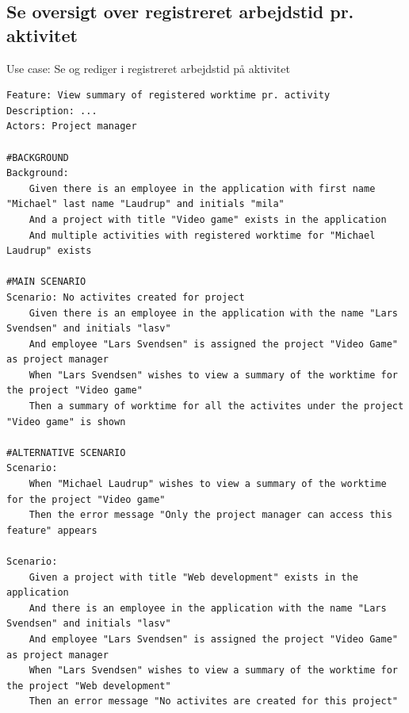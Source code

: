 \subsection{Se oversigt over registreret arbejdstid pr. aktivitet}
\begin{listing}[H]
    \centering
    \caption{Use case: Se og rediger i registreret arbejdstid på aktivitet}\label{lst:usecase_oversigt_over_registreret_arbejdstid_pr_aktivitet}
    \begin{verbatim}  
Feature: View summary of registered worktime pr. activity
Description: ...
Actors: Project manager

#BACKGROUND
Background: 
    Given there is an employee in the application with first name "Michael" last name "Laudrup" and initials "mila"
    And a project with title "Video game" exists in the application
    And multiple activities with registered worktime for "Michael Laudrup" exists

#MAIN SCENARIO
Scenario: No activites created for project
    Given there is an employee in the application with the name "Lars Svendsen" and initials "lasv"
    And employee "Lars Svendsen" is assigned the project "Video Game" as project manager
    When "Lars Svendsen" wishes to view a summary of the worktime for the project "Video game"
    Then a summary of worktime for all the activites under the project "Video game" is shown

#ALTERNATIVE SCENARIO
Scenario:  
    When "Michael Laudrup" wishes to view a summary of the worktime for the project "Video game"
    Then the error message "Only the project manager can access this feature" appears

Scenario: 
    Given a project with title "Web development" exists in the application
    And there is an employee in the application with the name "Lars Svendsen" and initials "lasv"
    And employee "Lars Svendsen" is assigned the project "Video Game" as project manager
    When "Lars Svendsen" wishes to view a summary of the worktime for the project "Web development"
    Then an error message "No activites are created for this project"

    \end{verbatim}
\end{listing}

